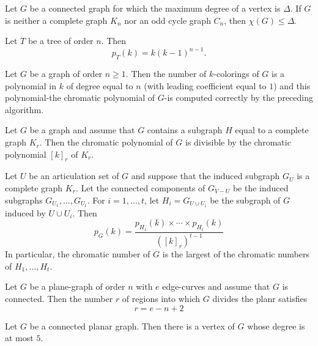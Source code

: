 \begin{theorem}
  \label{thm:12.1.6}
  Let $G$ be a connected graph for which the maximum degree of a vertex is $\Delta$. If $G$ is 
  neither a complete graph $K_n$ nor an odd cycle graph $C_n$, then $\chi(G) \leq \Delta$.
\end{theorem}

\begin{theorem}
  \label{thm:12.1.7}
  Let $T$ be a tree of order $n$. Then
  \[ p_T(k) = k(k-1)^{n-1}. \]
\end{theorem}

\begin{theorem}
  \label{thm:12.1.8}
  Let $G$ be a graph of order $n \geq 1$. Then the number of $k$-colorings of $G$ is a polynomial 
  in $k$ of degree equal to $n$ (with leading coefficient equal to $1$) and this polynomial-the 
  chromatic polynomial of $G$-is computed correctly by the preceding algorithm. 
\end{theorem}

\begin{theorem}
  \label{thm:12.1.9}
  Let $G$ be a graph and assume that $G$ contains a subgraph $H$ equal to a complete graph $K_r$. 
  Then the chromatic polynomial of $G$ is divisible by the chromatic polynomial $[k]_r$ of $K_r$.
\end{theorem}

\begin{theorem}
  \label{thm:12.1.10}
  Let $U$ be an articulation set of $G$ and suppose that the induced subgraph $G_U$ is a complete graph $K_r$. Let the connected components of $G_{V-U}$ be the induced subgraphs $G_{U_1}, \ldots, G_{U_t}$. For $i=1, \ldots, t$, let $H_i=G_{U \cup U_i}$ be the subgraph of $G$ induced by $U \cup U_i$. Then
  $$
  p_G(k)=\frac{p_{H_1}(k) \times \cdots \times p_{H_t}(k)}{\left([k]_r\right)^{t-1}}
  $$
  In particular, the chromatic number of $G$ is the largest of the chromatic numbers of $H_1, \ldots, H_t$.
\end{theorem}

\begin{theorem}
  \label{thm:12.2.1}
  Let $G$ be a plane-graph of order $n$ with $e$ edge-curves and assume that $G$ is connected. Then the number $r$ of regions into which $G$ divides the planr satisfies
  \begin{equation}\label{12.4}
    r=e-n+2
  \end{equation}
\end{theorem}

\begin{theorem}
  \label{thm:12.2.2}
  Let $G$ be a connected planar graph. Then there is a vertex of $G$ whose degree is at most $5$.
\end{theorem}

